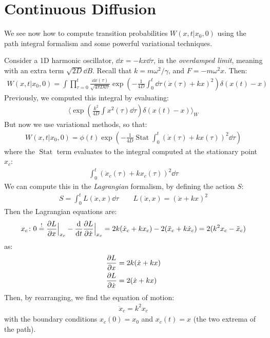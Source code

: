\documentclass[../template.tex]{subfiles}
\begin{document}
\section{Continuous Diffusion}
We see now how to compute transition probabilities $W(x,t|x_0,0)$ using the path integral formalism and some powerful variational techniques.

Consider a 1D harmonic oscillator, $\dd{x} = - k x \dd{\tau}$, in the \textit{overdamped limit}, meaning with an extra term $\sqrt{2D} \dd{B}$. Recall that $k = m\omega^2/\gamma$, and $F = -m \omega^2 x$. Then:
\begin{align*}
    W(x,t|x_0,0) = \int \prod_{\tau = 0}^t \frac{\dd{x(\tau)}}{\sqrt{4 \pi D \dd{\tau}}} \exp\left(-\frac{1}{4D} \int_0^t \dd{\tau}(\dot{x}(\tau) + kx)^2 \right) \delta(x(t)-x) 
\end{align*}      
Previously, we computed this integral by evaluating:
\begin{align*}
    \langle \exp\left(\frac{k^2}{4D} \int x^2(\tau)\dd{\tau} \right) \delta(x(t)-x) \rangle_W
\end{align*}
But now we use variational methods, so that:
\begin{align*}
    W(x,t|x_0,0) = \phi(t) \exp\left(-\frac{1}{4D} \operatorname{Stat} \int_0^t (\dot{x}(\tau) + kx(\tau))^2 \dd{\tau}  \right)
\end{align*}
where the $\operatorname{Stat}$ term evaluates to the integral computed at the stationary point $x_c$:
\begin{align*}
    \int_0^t (\dot{x}_c(\tau) +kx_c(\tau))^2 \dd{\tau}
\end{align*}  
We can compute this in the \textit{Lagrangian} formalism, by defining the action $S$:
\begin{align*}
    S = \int_0^t L(\dot{x}, x) \dd{\tau} \qquad L(\dot{x},x) = (\dot{x} + kx)^2
\end{align*}  
Then the Lagrangian equations are:
\begin{align*}
    x_c \colon 0 \overset{!}{=}  \pdv{L}{x} \Big|_{x_c} - \dv{t} \pdv{L}{\dot{x}} \Big|_{x_c} = 2k(\dot{x}_c + kx_c) - 2(\ddot{x}_c + k\dot{x}_c) = 2(k^2 x_c - \ddot{x}_c) 
\end{align*}
as:
\begin{align*}
    \pdv{L}{x} &= 2k(\dot{x} + kx)\\
    \pdv{L}{\dot{x}} &= 2(\dot{x} + kx)
\end{align*}
Then, by rearranging, we find the equation of motion:
\begin{align*}
    \ddot{x}_c = k^2 x_c
\end{align*}
with the boundary conditions $x_c(0) = x_0$ and $x_c(t) = x$ (the two extrema of the path).
\end{document}
